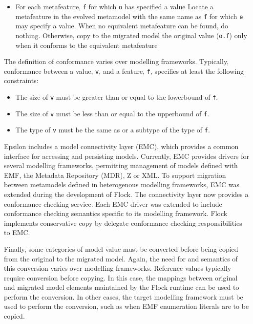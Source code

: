 \begin{itemize}
	\item For each metafeature, \texttt{f} for which \texttt{o} has specified a value
		\subitem Locate a metafeature in the evolved metamodel with the same name as \texttt{f} for which \texttt{e} may specify a value.
			\subsubitem When no equivalent metafeature can be found, do nothing.
			\subsubitem Otherwise, copy to the migrated model the original value (\texttt{o.f}) only when it conforms to the equivalent metafeature
\end{itemize}

The definition of conformance varies over modelling frameworks. Typically, conformance between a value, \texttt{v}, and a feature, \texttt{f}, specifies at least the following constraints:

\begin{itemize}
	\item The size of \texttt{v} must be greater than or equal to the lowerbound of \texttt{f}.
	\item The size of \texttt{v} must be less than or equal to the upperbound of \texttt{f}.
	\item The type of \texttt{v} must be the same as or a subtype of the type of \texttt{f}.
\end{itemize}


Epsilon includes a model connectivity layer (EMC), which provides a common interface for accessing and persisting models. Currently, EMC provides drivers for several modelling frameworks, permitting management of models defined with EMF, the Metadata Repository (MDR), Z or XML. To support migration between metamodels defined in heterogenous modelling frameworks, EMC was extended during the development of Flock. The connectivity layer now provides a conformance checking service. Each EMC driver was extended to include conformance checking semantics specific to its modelling framework. Flock implements conservative copy by delegate conformance checking responsibilities to EMC. 

Finally, some categories of model value must be converted before being copied from the original to the migrated model. Again, the need for and semantics of this conversion varies over modelling frameworks. Reference values typically require conversion before copying. In this case, the mappings between original and migrated model elements maintained by the Flock runtime can be used to perform the conversion. In other cases, the target modelling framework must be used to perform the conversion, such as when EMF enumeration literals are to be copied.


